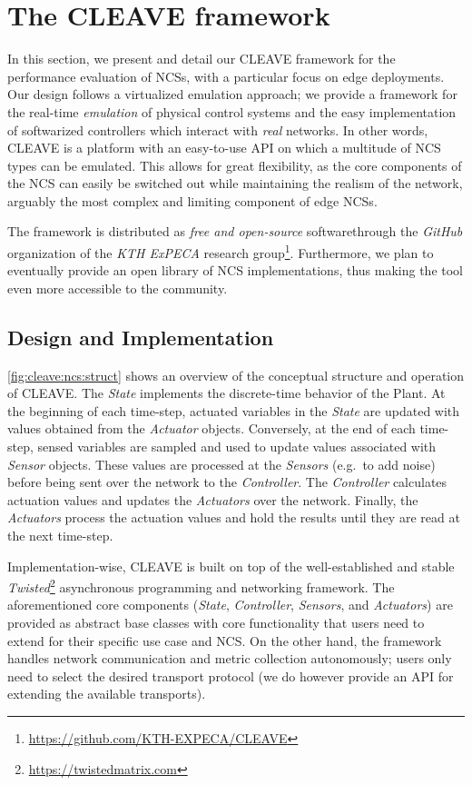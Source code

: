 \section{The \ac{CLEAVE} framework}\label{sec:approach}

In this section, we present and detail our \ac{CLEAVE} framework for the performance evaluation of \aclp{NCS}, with a particular focus on edge deployments.
Our design follows a virtualized emulation approach; we provide a framework for the real-time \emph{emulation} of physical control systems and the easy implementation of softwarized controllers which interact with \emph{real} networks.
In other words, \ac{CLEAVE} is a platform with an easy-to-use \ac{API} on which a multitude of \ac{NCS} types can be emulated.
This allows for great flexibility, as the core components of the \ac{NCS} can easily be switched out while maintaining the realism of the network, arguably the most complex and limiting component of edge \acp{NCS}.

The framework is distributed as \emph{free and open-source} softwarethrough the \emph{GitHub} organization of the \emph{KTH ExPECA} research group\footnote{\url{https://github.com/KTH-EXPECA/CLEAVE}}.
Furthermore, we plan to eventually provide an open library of \ac{NCS} implementations, thus making the tool even more accessible to the community.

\subsection{Design and Implementation}

\cref{fig:cleave:ncs:struct} shows an overview of the conceptual structure and operation of \ac{CLEAVE}.
The \emph{State} implements the discrete-time behavior of the Plant.
At the beginning of each time-step, actuated variables in the \emph{State} are updated with values obtained from the \emph{Actuator} objects.
Conversely, at the end of each time-step, sensed variables are sampled and used to update values associated with \emph{Sensor} objects.
These values are processed at the \emph{Sensors} (e.g.\ to add noise) before being sent over the network to the \emph{Controller}.
The \emph{Controller} calculates actuation values and updates the \emph{Actuators} over the network.
Finally, the \emph{Actuators} process the actuation values and hold the results until they are read at the next time-step.

Implementation-wise, \ac{CLEAVE} is built on top of the well-established and stable \emph{Twisted}\footnote{\url{https://twistedmatrix.com}} asynchronous programming and networking framework.
The aforementioned core components (\emph{State}, \emph{Controller}, \emph{Sensors}, and \emph{Actuators}) are provided as abstract base classes with core functionality that users need to extend for their specific use case and \ac{NCS}.
On the other hand, the framework handles network communication and metric collection autonomously; users only need to select the desired transport protocol (we do however provide an \ac{API} for extending the available transports).

